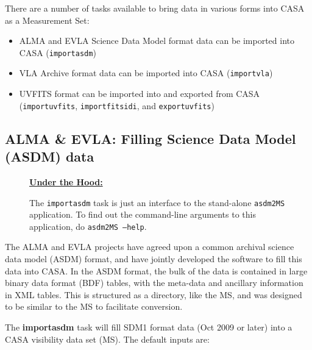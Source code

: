 There are a number of tasks available to bring data in various forms
into CASA as a Measurement Set:

\begin{itemize}

\item ALMA and EVLA Science Data Model format data can be imported
      into CASA ({\tt importasdm})

\item VLA Archive format data can be imported into CASA
      ({\tt importvla})

\item UVFITS format can be imported into and exported from CASA
      ({\tt importuvfits}, {\tt importfitsidi}, and {\tt exportuvfits})

\end{itemize}

\subsection{ALMA \& EVLA: Filling Science Data Model (ASDM) data}
\label{section:io.import.asdm}

\begin{wrapfigure}{r}{2.5in}
  \begin{boxedminipage}{2.5in}
     \centerline{\underline{\bf Under the Hood:}}
     The {\tt importasdm} task is just an interface to the stand-alone
     {\tt asdm2MS} application.  To find out the command-line
     arguments to this application, do {\tt asdm2MS --help}.
  \end{boxedminipage}
\end{wrapfigure}

The ALMA and EVLA projects have agreed upon a common archival science
data model (ASDM) format, and have jointly developed the software to
fill this data into CASA.  In the ASDM format, the bulk of the data is
contained in large binary data format (BDF) tables, with the meta-data
and ancillary information in XML tables.  This is structured as a
directory, like the MS, and was designed to be similar to the MS to 
facilitate conversion.

The {\bf importasdm} task will fill SDM1 format data (Oct 2009 or
later) into a CASA visibility data set (MS).  The default inputs are:

